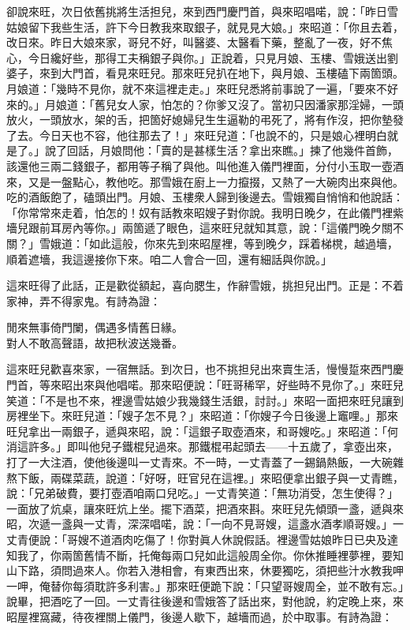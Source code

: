 卻說來旺，次日依舊挑將生活担兒，來到西門慶門首，與來昭唱喏，說：「昨日雪姑娘留下我些生活，許下今日教我來取銀子，就見見大娘。」來昭道：「你且去着，改日來。昨日大娘來家，哥兒不好，叫醫婆、太醫看下藥，整亂了一夜，好不焦心，今日纔好些，那得工夫稱銀子與你。」正說着，只見月娘、玉樓、雪娥送出劉婆子，來到大門首，看見來旺兒。那來旺兒扒在地下，與月娘、玉樓磕下兩箇頭。月娘道：「幾時不見你，就不來這裡走走。」來旺兒悉將前事說了一遍，「要來不好來的。」月娘道：「舊兒女人家，怕怎的？你爹又沒了。當初只因潘家那淫婦，一頭放火，一頭放水，架的舌，把箇好媳婦兒生生逼勒的弔死了，將有作沒，把你墊發了去。今日天也不容，他往那去了！」{}來旺兒道：「也說不的，只是娘心裡明白就是了。」說了回話，月娘問他：「賣的是甚樣生活？拿出來瞧。」揀了他幾件首飾，該還他三兩二錢銀子，都用等子稱了與他。叫他進入儀門裡面，{}分付小玉取一壺酒來，又是一盤點心，教他吃。那雪娥在廚上一力攛掇，又熱了一大碗肉出來與他。吃的酒飯飽了，磕頭出門。月娘、玉樓衆人歸到後邊去。{}雪娥獨自悄悄和他說話：「你常常來走着，怕怎的！奴有話教來昭嫂子對你說。我明日晚夕，在此儀門裡紫墻兒跟前耳房內等你。」兩箇遞了眼色，這來旺兒就知其意，說：「這儀門晚夕關不關？」雪娥道：「如此這般，你來先到來昭屋裡，等到晚夕，踩着梯櫈，越過墻，順着遮墻，我這邊接你下來。咱二人會合一回，還有細話與你說。」

這來旺得了此話，正是歡從額起，喜向腮生，作辭雪娥，挑担兒出門。正是：不着家神，弄不得家鬼。有詩為證：

\begin{myquote}
閒來無事倚門闌，偶遇多情舊日緣。\\對人不敢高聲語，故把秋波送幾番。
\end{myquote}

這來旺兒歡喜來家，一宿無話。到次日，也不挑担兒出來賣生活，慢慢踅來西門慶門首，等來昭出來與他唱喏。那來昭便說：「旺哥稀罕，好些時不見你了。」來旺兒笑道：「不是也不來，裡邊雪姑娘少我幾錢生活銀，討討。」來昭一面把來旺兒讓到房裡坐下。來旺兒道：「嫂子怎不見？」來昭道：「你嫂子今日後邊上竈哩。」那來旺兒拿出一兩銀子，遞與來昭，{}說：「這銀子取壺酒來，和哥嫂吃。」來昭道：「何消這許多。」即叫他兒子鐵棍兒過來。那鐵棍弔起頭去——十五歲了，拿壺出來，打了一大注酒，使他後邊叫一丈青來。不一時，一丈青蓋了一錫鍋熱飯，一大碗雜熬下飯，兩碟菜蔬，說道：「好呀，旺官兒在這裡。」來昭便拿出銀子與一丈青瞧，說：「兄弟破費，要打壺酒咱兩口兒吃。」一丈青笑道：「無功消受，怎生使得？」一面放了炕桌，讓來旺炕上坐。擺下酒菜，把酒來斟。來旺兒先傾頭一盞，遞與來昭，次遞一盞與一丈青，深深唱喏，說：「一向不見哥嫂，這盞水酒孝順哥嫂。」一丈青便說：「哥嫂不道酒肉吃傷了！你對眞人休說假話。裡邊雪姑娘昨日已央及達知我了，你兩箇舊情不斷，托俺每兩口兒如此這般周全你。你休推睡裡夢裡，要知山下路，須問過來人。你若入港相會，有東西出來，休要獨吃，須把些汁水教我呷一呷，俺替你每須耽許多利害。」那來旺便跪下說：「只望哥嫂周全，並不敢有忘。」說畢，把酒吃了一回。一丈青往後邊和雪娥答了話出來，對他說，約定晚上來，來昭屋裡窩藏，待夜裡關上儀門，後邊人歇下，越墻而過，於中取事。有詩為證：

